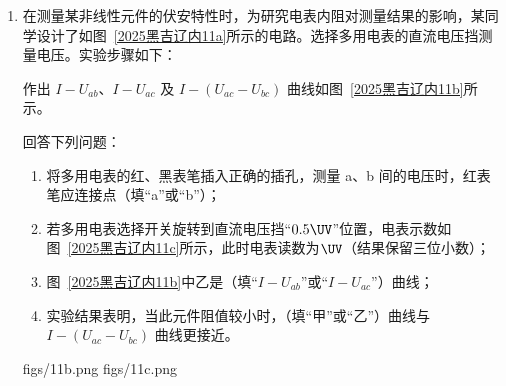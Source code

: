 \documentclass[\gkver]{gaokaozhenti}
\begin{document}
\begin{enumerate}
{则 $t = t_{0}$ 之前，地面和斜面之间摩擦力为零，C 错误；

D．$t = t_{0}$ 之后，乙物体保持静止，甲物体继续沿斜面向下加速，由系统牛顿第二定律可得 $f = ma_{1}\cos\theta$

即地面对斜面的摩擦力向左，D 正确。

故选 AD。
}

\item
在测量某非线性元件的伏安特性时，为研究电表内阻对测量结果的影响，某同学设计了如图~\ref{2025黑吉辽内11a}所示的电路。选择多用电表的直流电压挡测量电压。实验步骤如下：

作出 $I-U_{ab}$、$I-U_{ac}$ 及 $I-(U_{ac} - U_{bc})$ 曲线如图~\ref{2025黑吉辽内11b}所示。

回答下列问题：
\begin{enumerate}
\item
将多用电表的红、黑表笔插入正确的插孔，测量 a、b 间的电压时，红表笔应连接点（填“a”或“b”）；
\item
若多用电表选择开关旋转到直流电压挡“$0.5 \UV$”位置，电表示数如图~\ref{2025黑吉辽内11c}所示，此时电表读数为$\UV$（结果保留三位小数）；
\item
图~\ref{2025黑吉辽内11b}中乙是（填“$I-U_{ab}$”或“$I-U_{ac}$”）曲线；
\item
实验结果表明，当此元件阻值较小时，（填“甲”或“乙”）曲线与 $I-(U_{ac} - U_{bc})$ 曲线更接近。
\end{enumerate}

{figs/11b.png}
{figs/11c.png}


\end{enumerate}
\end{document}
